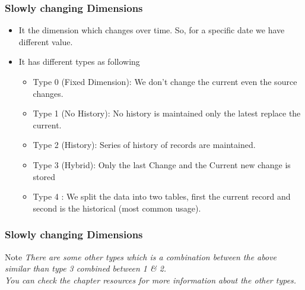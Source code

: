 \VideoClassification[column=1, colour=red]
\begin{frame}
    \frametitle{Slowly changing Dimensions}
    \begin{itemize}[<+->]
		\item It the dimension which changes over time. So, for a specific date we have different value.
		\item It has different types as following
		    \begin{itemize}[<+->]
        \item Type 0 (Fixed Dimension): We don't change the current even the source changes. 
        \item Type 1 (No History): No history is maintained only the latest replace the current.
        \item Type 2 (History): Series of history of records are maintained.
        \item Type 3 (Hybrid): Only the last Change and the Current new change is stored
        \item Type 4 : We split the data into two tables, first the current record and second is the historical (most common usage).
    \end{itemize}   


    \end{itemize}
\end{frame}
\begin{frame}
	\frametitle{Slowly changing Dimensions}
\begin{block}{Note}
	\textit{There are some other types which is a combination between the above similar than type 3 combined between 1 \& 2. \\ You can check the chapter resources for more information about the other types.}
\end{block}
\end{frame}
